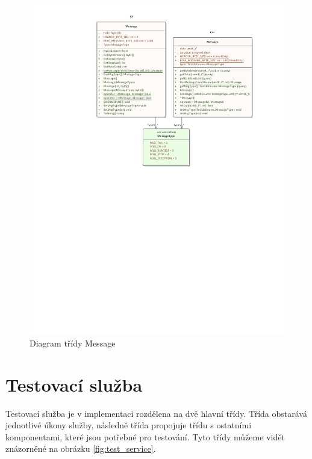 \begin{figure}[H]
    \centering 
    \includegraphics[width=\textwidth]{assets/img/class_diagram/message.pdf}
    \caption{Diagram třídy Message}
    \label{fig:message_class}
\end{figure}

\section{Testovací služba}
Testovací služba je v implementaci rozdělena na dvě hlavní třídy. Třída  obstarává jednotlivé úkony služby, následně třída  propojuje třídu  s ostatními komponentami, které jsou potřebné pro testování. Tyto třídy můžeme vidět znázorněné na obrázku \ref{fig:test_service}.

